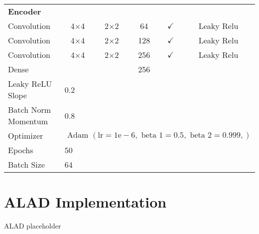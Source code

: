 \begin{table}[]
{\begin{tabular}{llcccc}
			\multicolumn{6}{l}{\textbf{Encoder}} \\
			Convolution & \multicolumn{1}{c}{4$\times$4} & 2$\times$2 & 64 & $\checkmark$ & Leaky Relu \\
			Convolution & \multicolumn{1}{c}{4$\times$4} & 2$\times$2 & 128 & $\checkmark$ & Leaky Relu \\
			Convolution & \multicolumn{1}{c}{4$\times$4} & 2$\times$2 & 256 & $\checkmark$ & Leaky Relu \\
			Dense & \multicolumn{1}{c}{} &  & 256 &  &  \\ \hline
			Leaky ReLU Slope & \multicolumn{5}{l}{0.2} \\
			Batch Norm Momentum & \multicolumn{5}{l}{0.8} \\
			Optimizer & \multicolumn{5}{l}{$\text { Adam }(\mathrm{lr}=1 \mathrm{e}-6, \text { beta } 1=0.5, \text { beta } 2=0.999,)$} \\ \hline
			Epochs & 50 & \multicolumn{1}{l}{} & \multicolumn{1}{l}{} & \multicolumn{1}{l}{} & \multicolumn{1}{l}{} \\
			Batch Size & \multicolumn{5}{l}{64}
		\end{tabular}%
	}
\end{table}

\section{ALAD Implementation}

ALAD placeholder

